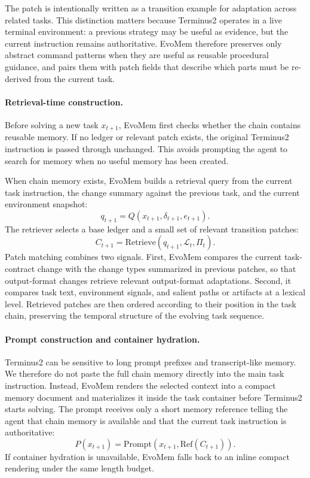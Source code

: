 \documentclass{article}
\begin{document}
The patch is intentionally written as a transition example for adaptation across related tasks. This distinction matters because Terminus2 operates in a live terminal environment: a previous strategy may be useful as evidence, but the current instruction remains authoritative. EvoMem therefore preserves only abstract command patterns when they are useful as reusable procedural guidance, and pairs them with patch fields that describe which parts must be re-derived from the current task.

\paragraph{Retrieval-time construction.}
Before solving a new task $x_{t+1}$, EvoMem first checks whether the chain contains reusable memory. If no ledger or relevant patch exists, the original Terminus2 instruction is passed through unchanged. This avoids prompting the agent to search for memory when no useful memory has been created.

When chain memory exists, EvoMem builds a retrieval query from the current task instruction, the change summary against the previous task, and the current environment snapshot:
\[
q_{t+1}=Q(x_{t+1},\delta_{t+1},e_{t+1}).
\]
The retriever selects a base ledger and a small set of relevant transition patches:
\[
C_{t+1}=\mathrm{Retrieve}(q_{t+1},\mathcal{L}_t,\Pi_t).
\]
Patch matching combines two signals. First, EvoMem compares the current task-contract change with the change types summarized in previous patches, so that output-format changes retrieve relevant output-format adaptations. Second, it compares task text, environment signals, and salient paths or artifacts at a lexical level. Retrieved patches are then ordered according to their position in the task chain, preserving the temporal structure of the evolving task sequence.

\paragraph{Prompt construction and container hydration.}
Terminus2 can be sensitive to long prompt prefixes and transcript-like memory. We therefore do not paste the full chain memory directly into the main task instruction. Instead, EvoMem renders the selected context into a compact memory document and materializes it inside the task container before Terminus2 starts solving. The prompt receives only a short memory reference telling the agent that chain memory is available and that the current task instruction is authoritative:
\[
P(x_{t+1})=
\mathrm{Prompt}\!\left(x_{t+1},\mathrm{Ref}(C_{t+1})\right).
\]
If container hydration is unavailable, EvoMem falls back to an inline compact rendering under the same length budget.
\end{document}
